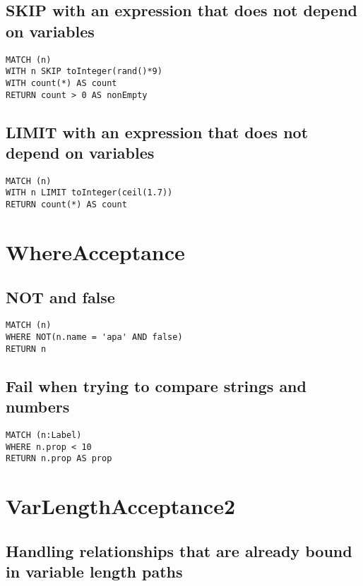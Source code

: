 \subsection{SKIP with an expression that does not depend on variables}

\begin{lstlisting}
MATCH (n)
WITH n SKIP toInteger(rand()*9)
WITH count(*) AS count
RETURN count > 0 AS nonEmpty
\end{lstlisting}

\subsection{LIMIT with an expression that does not depend on variables}

\begin{lstlisting}
MATCH (n)
WITH n LIMIT toInteger(ceil(1.7))
RETURN count(*) AS count
\end{lstlisting}
\section{WhereAcceptance}


\subsection{NOT and false}

\begin{lstlisting}
MATCH (n)
WHERE NOT(n.name = 'apa' AND false)
RETURN n
\end{lstlisting}

\subsection{Fail when trying to compare strings and numbers}

\begin{lstlisting}
MATCH (n:Label)
WHERE n.prop < 10
RETURN n.prop AS prop
\end{lstlisting}
\section{VarLengthAcceptance2}


\subsection{Handling relationships that are already bound in variable length paths}

